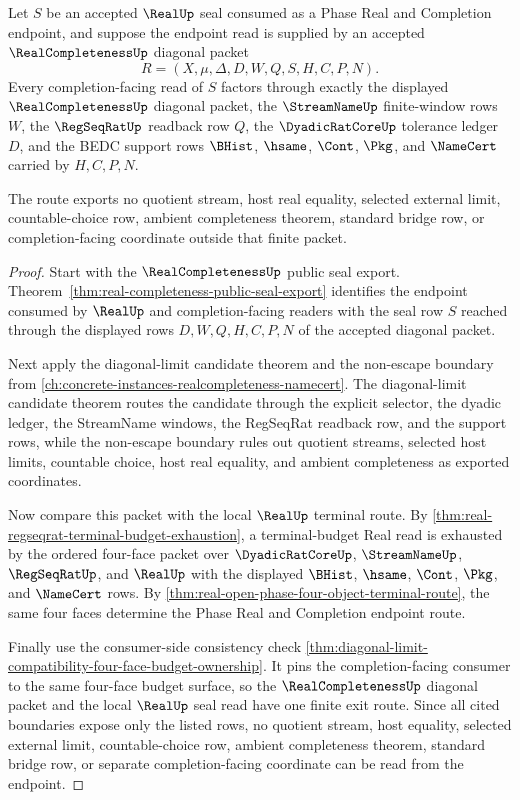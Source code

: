 \begin{theorem}
\label{thm:real-realcompleteness-exit-route}
Let $S$ be an accepted $\RealUp$ seal consumed as a Phase Real and Completion endpoint, and suppose the endpoint read is supplied by an accepted $\RealCompletenessUp$ diagonal packet
$$
R=(X,\mu,\Delta,D,W,Q,S,H,C,P,N).
$$
Every completion-facing read of $S$ factors through exactly the displayed $\RealCompletenessUp$ diagonal packet, the $\StreamNameUp$ finite-window rows $W$, the $\RegSeqRatUp$ readback row $Q$, the $\DyadicRatCoreUp$ tolerance ledger $D$, and the BEDC support rows $\BHist$, $\hsame$, $\Cont$, $\Pkg$, and $\NameCert$ carried by $H,C,P,N$.

The route exports no quotient stream, host real equality, selected external limit, countable-choice row, ambient completeness theorem, standard bridge row, or completion-facing coordinate outside that finite packet.
\end{theorem}
\begin{proof}
Start with the $\RealCompletenessUp$ public seal export. Theorem~\ref{thm:real-completeness-public-seal-export} identifies the endpoint consumed by $\RealUp$ and completion-facing readers with the seal row $S$ reached through the displayed rows $D,W,Q,H,C,P,N$ of the accepted diagonal packet.

Next apply the diagonal-limit candidate theorem and the non-escape boundary from \autoref{ch:concrete-instances-realcompleteness-namecert}. The diagonal-limit candidate theorem routes the candidate through the explicit selector, the dyadic ledger, the StreamName windows, the RegSeqRat readback row, and the support rows, while the non-escape boundary rules out quotient streams, selected host limits, countable choice, host real equality, and ambient completeness as exported coordinates.

Now compare this packet with the local $\RealUp$ terminal route. By \autoref{thm:real-regseqrat-terminal-budget-exhaustion}, a terminal-budget Real read is exhausted by the ordered four-face packet over $\DyadicRatCoreUp$, $\StreamNameUp$, $\RegSeqRatUp$, and $\RealUp$ with the displayed $\BHist$, $\hsame$, $\Cont$, $\Pkg$, and $\NameCert$ rows. By \autoref{thm:real-open-phase-four-object-terminal-route}, the same four faces determine the Phase Real and Completion endpoint route.

Finally use the consumer-side consistency check \autoref{thm:diagonal-limit-compatibility-four-face-budget-ownership}. It pins the completion-facing consumer to the same four-face budget surface, so the $\RealCompletenessUp$ diagonal packet and the local $\RealUp$ seal read have one finite exit route. Since all cited boundaries expose only the listed rows, no quotient stream, host equality, selected external limit, countable-choice row, ambient completeness theorem, standard bridge row, or separate completion-facing coordinate can be read from the endpoint.
\end{proof}

